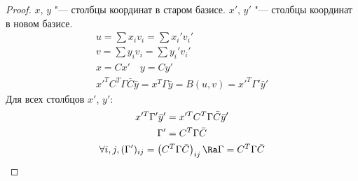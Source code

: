 \begin{proof}
	$x$, $y$ "--- столбцы координат в старом базисе.
	$x'$, $y'$ "--- столбцы координат в новом базисе.
	\begin{gather*}
		u = \sum x_i v_i = \sum x_i' v_i' \\
		v = \sum y_i v_i = \sum y_i' v_i' \\
		x = C x' \quad y = Cy' \\
		x'^T C^T\Gamma\bar C\bar y = x^T\Gamma \bar y = B(u, v) = x'^T \Gamma'\bar y'
	\end{gather*}
	Для всех столбцов $x'$, $y'$:
	\begin{gather*}
		x'^T \Gamma' \bar y' = x'^TC^T \Gamma \bar C\bar y' \\
		\Gamma' = C^T\Gamma\bar C \\
		\forall i, j, (\Gamma')_{ij} = \left(C^T\Gamma \bar C\right)_{ij} \Ra \Gamma = C^T\Gamma\bar C
	\end{gather*}
\end{proof}
